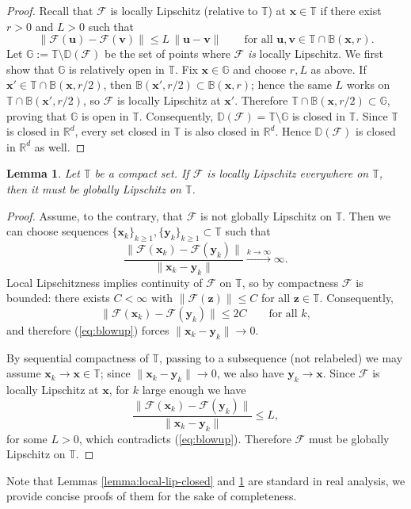 \documentclass{amsart} %
\def\eqref#1{equation~\ref{#1}}
\def\vu{{\bm{u}}}
\def\vv{{\bm{v}}}
\def\vx{{\bm{x}}}
\def\vy{{\bm{y}}}
\def\vz{{\bm{z}}}
\def\sB{{\mathbb{B}}}
\def\sD{{\mathbb{D}}}
\def\sG{{\mathbb{G}}}
\def\sR{{\mathbb{R}}}
\def\sT{{\mathbb{T}}}
\def\cF{{\mathcal{F}}}
\newtheorem{lemma}[theorem]{Lemma}
\theoremstyle{definition}
\theoremstyle{remark}
\renewcommand{\eqref}[1]{\textup{(\ref{#1})}}
\begin{document}
\begin{proof}
Recall that $\cF$ is locally Lipschitz (relative to $\sT$) at $\vx\in\sT$ if there exist $r>0$ and $L>0$ such that
\[
\|\cF(\vu)-\cF(\vv)\|\le L\,\|\vu-\vv\|\qquad\text{for all }\vu,\vv\in \sT\cap \sB(\vx,r).
\]
Let $\sG:=\sT\setminus\sD(\cF)$ be the set of points where $\cF$ \emph{is} locally Lipschitz. 
We first show that $\sG$ is relatively open in $\sT$. Fix $\vx\in\sG$ and choose $r,L$ as above.
If $\vx'\in\sT\cap \sB(\vx,r/2)$, then $\sB(\vx',r/2)\subset \sB(\vx,r)$; hence the same $L$ works on
$\sT\cap \sB(\vx',r/2)$, so $\cF$ is locally Lipschitz at $\vx'$. Therefore
$\sT\cap \sB(\vx,r/2)\subset\sG$, proving that $\sG$ is open in $\sT$.
Consequently, $\sD(\cF)=\sT\setminus\sG$ is closed in $\sT$. 
Since $\sT$ is closed in $\sR^d$, every set closed in $\sT$ is also closed in $\sR^d$.
Hence $\sD(\cF)$ is closed in $\sR^d$ as well.
\end{proof}


\begin{lemma}
\label{lemma:local-Lip}
Let $\sT$ be a compact set. If $\cF$ is locally Lipschitz everywhere on $\sT$, then it must be globally Lipschitz on $\sT$.
\end{lemma}
\begin{proof}
Assume, to the contrary, that $\cF$ is not globally Lipschitz on $\sT$. Then we can choose sequences $\{\vx_k\}_{k\ge1},\{\vy_k\}_{k\ge1}\subset\sT$ such that
\begin{equation}\label{eq:blowup}
\frac{\|\cF(\vx_k)-\cF(\vy_k)\|}{\|\vx_k - \vy_k\|}\xrightarrow[]{k\to\infty}\infty.
\end{equation}
Local Lipschitzness implies continuity of $\cF$ on $\sT$, so by compactness $\cF$ is bounded:
there exists $C<\infty$ with $\|\cF(\vz)\|\le C$ for all $\vz\in\sT$. Consequently,
\[
\|\cF(\vx_k)-\cF(\vy_k)\|\le 2C\qquad\text{for all }k,
\]
and therefore \eqref{eq:blowup} forces $\|\vx_k - \vy_k\|\to 0$.

By sequential compactness of $\sT$, passing to a subsequence (not relabeled) we may assume $\vx_k\to \vx\in\sT$; since $\|\vx_k - \vy_k\|\to0$, we also have $\vy_k\to \vx$. Since $\cF$ is locally Lipschitz at $\vx$, for $k$ large enough we have 
\[
\frac{\|\cF(\vx_k)-\cF(\vy_k)\|}{\|\vx_k - \vy_k\|}\le L,
\]
for some $L>0$, which contradicts \eqref{eq:blowup}. Therefore $\cF$ must be globally Lipschitz on $\sT$. 
\end{proof}

Note that Lemmas \ref{lemma:local-lip-closed} and \ref{lemma:local-Lip} are standard in real analysis, we provide concise proofs of them for the sake of completeness. 
\end{document}

